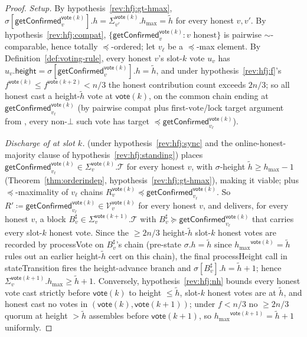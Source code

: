 \ifx\litemode\undefined\documentclass{article}\fi
\newcommand{\T}[0]{\ensuremath{\mathcal{T}}}
\newcommand{\V}[0]{\ensuremath{\mathcal{V}}}
\newcommand{\height}{\mathsf{height}}
\newcommand{\hmax}{\ensuremath{h_{\max}}\xspace}
\newcommand{\stateTransition}{\textsf{stateTransition}\xspace}
\newcommand{\processHeight}{\textsf{processHeight}\xspace}
\newcommand{\processVote}{\textsf{processVote}\xspace}
\newcommand{\vote}{\ensuremath{\mathsf{vote}}}
\newcommand{\comm}[1]{\ensuremath{\widetilde{#1}}}
\newcommand{\getConfirmed}{\textsf{getConfirmed}\xspace}
\theoremstyle{plain}
\theoremstyle{definition}
\theoremstyle{remark}
\begin{document}
\begin{proof}
\emph{Setup.}
By hypothesis~\ref{rev:hfj:gt-hmax}, $\sigma[\getConfirmed_v^{\vote(k)}].h = \Sigma_{v'}^{\vote(k)}.\hmax = \comm{h}$ for every honest $v, v'$.
By hypothesis~\ref{rev:hfj:compat}, $\{\getConfirmed_v^{\vote(k)} : v \text{ honest}\}$ is pairwise $\sim$-comparable, hence totally $\preceq$-ordered; let $v_\ell$ be a $\preceq$-max element.
By Definition~\ref{def:voting-rule}, every honest $v$'s slot-$k$ vote $u_v$ has $u_v.\height = \sigma[\getConfirmed_v^{\vote(k)}].h = \comm{h}$, and under hypothesis~\ref{rev:hfj:f}'s $f^{\vote(k)} \leq f^{\vote(k+2)} < n/3$ the honest contribution count exceeds $2n/3$;
so all honest cast a height-$\comm{h}$ vote at $\vote(k)$, on the common chain ending at $\getConfirmed_{v_\ell}^{\vote(k)}$ (by pairwise compat plus first-vote/lock target argument from , every non-$\bot$ such vote has target $\preceq \getConfirmed_{v_\ell}^{\vote(k)}$).

\emph{Discharge of  at slot $k$.}
 (under hypothesis~\ref{rev:hfj:sync} and the online-honest-majority clause of hypothesis~\ref{rev:hfj:standing}) places $\getConfirmed_{v_\ell}^{\vote(k)} \in \Sigma_v^{\vote(k)}.\T$ for every honest $v$, with $\sigma$-height $\comm{h} \geq \hmax - 1$ (Theorem~\ref{thm:orderindep}, hypothesis~\ref{rev:hfj:gt-hmax}), making it viable;
 plus $\preceq$-maximality of $v_\ell$ chains $R_v^{\vote(k)} \preceq \getConfirmed_{v_\ell}^{\vote(k)}$.
So $R' \coloneqq \getConfirmed_{v_\ell}^{\vote(k)} \in \V_v^{\vote(k)}$ for every honest $v$, and  delivers, for every honest $v$, a block $B^\sharp_v \in \Sigma_v^{\vote(k+1)}.\T$ with $B^\sharp_v \succeq \getConfirmed_{v_\ell}^{\vote(k)}$ that carries every slot-$k$ honest vote.
Since the $\geq 2n/3$ height-$\comm{h}$ slot-$k$ honest votes are recorded by \processVote{} on $B^\sharp_v$'s chain (pre-state $\sigma.h = \comm{h}$ since $\hmax^{\vote(k)} = \comm{h}$ rules out an earlier height-$\comm{h}$ cert on this chain), the final \processHeight{} call in \stateTransition{} fires the height-advance branch and $\sigma[B^\sharp_v].h = \comm{h}+1$;
hence $\Sigma_v^{\vote(k+1)}.\hmax \geq \comm{h}+1$.
Conversely, hypothesis~\ref{rev:hfj:nh} bounds every honest vote cast strictly before $\vote(k)$ to height $\leq \comm{h}$, slot-$k$ honest votes are at $\comm{h}$, and honest cast no votes in $(\vote(k), \vote(k+1))$;
under $f<n/3$ no $\geq 2n/3$ quorum at height $> \comm{h}$ assembles before $\vote(k+1)$, so $\hmax^{\vote(k+1)} = \comm{h}+1$ uniformly.


\end{proof}
\end{document}
